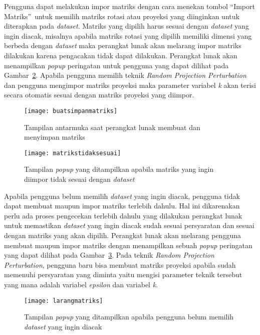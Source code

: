 Pengguna dapat melakukan impor matriks dengan cara menekan tombol \textquotedblleft Import Matriks\textquotedblright~untuk memilih matriks rotasi atau proyeksi yang diinginkan untuk diterapkan pada \textit{dataset}. Matriks yang dipilih harus sesuai dengan \textit{dataset} yang ingin diacak, misalnya apabila matriks rotasi yang dipilih memiliki dimensi yang berbeda dengan \textit{dataset} maka perangkat lunak akan melarang impor matriks dilakukan karena pengacakan tidak dapat dilakukan. Perangkat lunak akan menampilkan \textit{popup} peringatan untuk pengguna yang dapat dilihat pada Gambar~\ref{fig:matrikstidaksesuai}. Apabila pengguna memilih teknik \textit{Random Projection Perturbation} dan pengguna mengimpor matriks proyeksi maka parameter variabel \textit{k} akan terisi secara otomatis sesuai dengan matriks proyeksi yang diimpor.

\begin{figure}
	\centering
	\texttt{[image: buatsimpanmatriks]}
	\caption{Tampilan antarmuka saat perangkat lunak membuat dan menyimpan matriks}
	\label{fig:buatsimpanmatriks}
\end{figure}

\begin{figure}
	\centering
	\texttt{[image: matrikstidaksesuai]}
	\caption{Tampilan \textit{popup} yang ditampilkan apabila matriks yang ingin diimpor tidak sesuai dengan \textit{dataset}}
	\label{fig:matrikstidaksesuai}
\end{figure}

Apabila pengguna belum memilih \textit{dataset} yang ingin diacak, pengguna tidak dapat membuat maupun impor matriks terlebih dahulu. Hal ini dikarenakan perlu ada proses pengecekan terlebih dahulu yang dilakukan perangkat lunak untuk memastikan \textit{dataset} yang ingin diacak sudah sesuai persyaratan dan sesuai dengan matriks yang akan dipilih. Perangkat lunak akan melarang pengguna membuat maupun impor matriks dengan menampilkan sebuah \textit{popup} peringatan yang dapat dilihat pada Gambar~\ref{fig:larangmatriks}. Pada teknik \textit{Random Projection Perturbation}, pengguna baru bisa membuat matriks proyeksi apabila sudah memenuhi persyaratan yang diminta yaitu mengisi parameter teknik tersebut yang mana adalah variabel \textit{epsilon} dan variabel \textit{k}.

\begin{figure}
	\centering
	\texttt{[image: larangmatriks]}
	\caption{Tampilan \textit{popup} yang ditampilkan apabila pengguna belum memilih \textit{dataset} yang ingin diacak}
	\label{fig:larangmatriks}
\end{figure}

